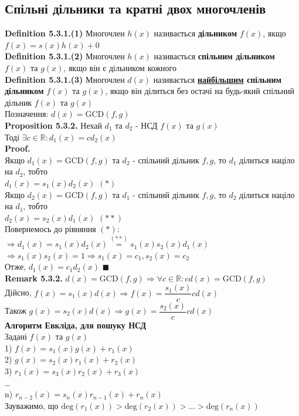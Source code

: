 \documentclass[a4paper, 14pt]{extarticle}
\def\defin#1{\textbf{Definition {#1}}}
\def\rm#1{\textbf{Remark {#1}}}
\def\prp#1{\textbf{Proposition {#1}}}
\def\proof{\textbf{Proof.}\\}
\def\bigline{\vspace{5mm}\\}
\def\qed{$\blacksquare$}
\begin{document}
\subsection{Спільні дільники та кратні двох многочленів}
\defin{5.3.1.(1)} Многочлен $h(x)$ називається \textbf{дільником} $f(x)$, якщо $f(x) = s(x)h(x) + 0$
\bigline
\defin{5.3.1.(2)} Многочлен $h(x)$ називається \textbf{спільним дільником} $f(x)$ та $g(x)$, якщо він є дільником кожного
\bigline
\defin{5.3.1.(3)} Многочлен $d(x)$ називається \textbf{\underline{найбільшим} спільним дільником} $f(x)$ та $g(x)$, якщо він ділиться без остачі на будь-який спільний дільник $f(x)$ та $g(x)$\\
Позначення: $d(x) = \textrm{GCD}(f,g)$
\bigline
\prp{5.3.2.} Нехай $d_1$ та $d_2$ - НСД $f(x)$ та $g(x)$\\
Тоді $\exists c \in \mathbb{R}: d_1(x) = cd_2(x)$\\
\proof
Якщо $d_1(x) = \textrm{GCD}(f,g)$ та $d_2$ - спільний дільник $f,g$, то $d_1$ ділиться націло на $d_2$, тобто\\ $d_1(x) = s_1(x) d_2(x)$ $(*)$\\
Якщо $d_2(x) = \textrm{GCD}(f,g)$ та $d_1$ - спільний дільник $f,g$, то $d_2$ ділиться націло на $d_1$, тобто\\$d_2(x) = s_2(x) d_1(x)$ $(**)$\\
Повернемось до рівняння $(*)$:\\
$\Rightarrow d_1(x) = s_1(x) d_2(x) \overset{(**)}{=} s_1(x)s_2(x)d_1(x)$\\
$\Rightarrow s_1(x)s_2(x) = 1 \Rightarrow s_1(x) = c_1, s_2(x) = c_2$\\
Отже, $d_1(x) = c_1 d_2(x)$ \qed
\bigline
\rm{5.3.2.} $d(x) = \textrm{GCD}(f,g) \Rightarrow \forall c \in \mathbb{R}: c d(x) = \textrm{GCD}(f,g)$\\
Дійсно, $f(x) = s_1(x)d(x) \Rightarrow f(x) = \dfrac{s_1(x)}{c} cd(x)$\\
Також $g(x) = s_2(x)d(x) \Rightarrow g(x) = \dfrac{s_2(x)}{c} cd(x)$
\bigline
\textbf{Алгоритм Евкліда, для пошуку НСД}\\
Задані $f(x)$ та $g(x)$\\
1) $f(x) = s_1(x) g(x) + r_1(x)$\\
2) $g(x) = s_2(x) r_1(x) + r_2(x)$\\
3) $r_1(x) = s_3(x) r_2(x) + r_3(x)$\\
\dots \\
n) $r_{n-2}(x) = s_n(x)r_{n-1}(x) + r_n(x)$\\
Зауважимо, що $\textrm{deg}(r_1(x)) > \textrm{deg}(r_2(x)) > \dots > \textrm{deg}(r_n(x))$\\
\end{document}
